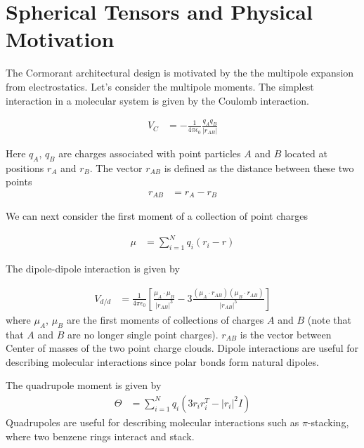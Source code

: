 \documentclass[book.tex]{subfiles}
\begin{document}

\section{Spherical Tensors and Physical Motivation}

The Cormorant architectural design is motivated by the the multipole expansion from electrostatics. Let's consider the multipole moments. The simplest interaction in a molecular system is given by the Coulomb interaction.

\begin{align}
    V_C &= -\frac{1}{4 \pi \epsilon_0} \frac{q_A q_B}{|r_{AB}|}
\end{align}

Here $q_A$, $q_B$ are charges associated with point particles $A$ and $B$ located at positions $r_A$ and $r_B$. The vector $r_{AB}$ is defined as the distance between these two points
\begin{align}
    r_{AB} &= r_A - r_B
\end{align}

We can next consider the first moment of a collection of point charges 

\begin{align}
\mu &= \sum_{i=1}^N q_i(r_i - r)
\end{align}

The dipole-dipole interaction is given by

\begin{align}
V_{d/d} &= \frac{1}{4 \pi \epsilon_0} \left [ \frac{\mu_A \cdot \mu_B}{|r_{AB}|^3} - 3 \frac{(\mu_A \cdot r_{AB}) (\mu_B \cdot r_{AB})}{ |r_{AB}|^5} \right ]
\end{align}
where $\mu_A$, $\mu_B$ are the first moments of collections of charges $A$ and $B$ (note that that $A$ and $B$ are no longer single point charges). $r_{AB}$ is the vector between Center of masses of the two point charge clouds. Dipole interactions are useful for describing molecular interactions since polar bonds form natural dipoles.

The quadrupole moment is given by 
\begin{align}
    \Theta &= \sum_{i=1}^N q_i (3r_i r_i^T - |r_i|^2 I)
\end{align}
Quadrupoles are useful for describing molecular interactions such as $\pi$-stacking, where two benzene rings interact and stack. 
\end{document}
